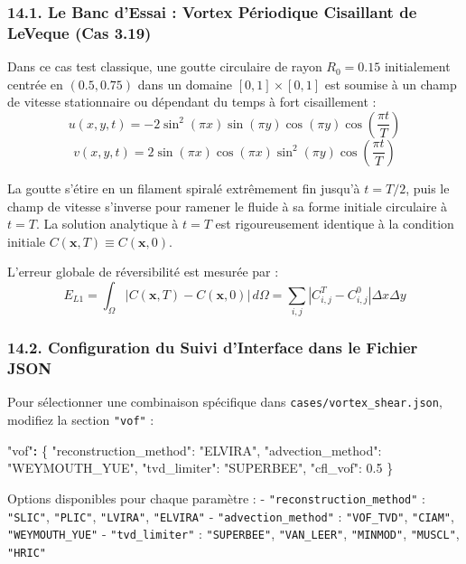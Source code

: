 \documentclass[
  french,
]{article}
\newenvironment{Shaded}{}{}
\newcommand{\DataTypeTok}[1]{\textcolor[rgb]{0.56,0.13,0.00}{#1}}
\newcommand{\ErrorTok}[1]{\textcolor[rgb]{1.00,0.00,0.00}{\textbf{#1}}}
\newcommand{\FloatTok}[1]{\textcolor[rgb]{0.25,0.63,0.44}{#1}}
\newcommand{\FunctionTok}[1]{\textcolor[rgb]{0.02,0.16,0.49}{#1}}
\newcommand{\StringTok}[1]{\textcolor[rgb]{0.25,0.44,0.63}{#1}}
\begin{document}
\subsubsection{14.1. Le Banc d'Essai : Vortex Périodique Cisaillant de
LeVeque (Cas
3.19)}\label{le-banc-dessai-vortex-puxe9riodique-cisaillant-de-leveque-cas-3.19}

Dans ce cas test classique, une goutte circulaire de rayon
\(R_0 = 0.15\) initialement centrée en \((0.5, 0.75)\) dans un domaine
\([0, 1] \times [0, 1]\) est soumise à un champ de vitesse stationnaire
ou dépendant du temps à fort cisaillement :
\[u(x, y, t) = -2 \sin^2(\pi x) \sin(\pi y) \cos(\pi y) \cos\left(\frac{\pi t}{T}\right)\]
\[v(x, y, t) = 2 \sin(\pi x) \cos(\pi x) \sin^2(\pi y) \cos\left(\frac{\pi t}{T}\right)\]

La goutte s'étire en un filament spiralé extrêmement fin jusqu'à
\(t = T/2\), puis le champ de vitesse s'inverse pour ramener le fluide à
sa forme initiale circulaire à \(t = T\). La solution analytique à
\(t = T\) est rigoureusement identique à la condition initiale
\(C(\mathbf{x}, T) \equiv C(\mathbf{x}, 0)\).

L'erreur globale de réversibilité est mesurée par :
\[E_{L1} = \int_\Omega |C(\mathbf{x}, T) - C(\mathbf{x}, 0)| \, d\Omega = \sum_{i, j} |C_{i, j}^T - C_{i, j}^0| \Delta x \Delta y\]

\subsubsection{14.2. Configuration du Suivi d'Interface dans le Fichier
JSON}\label{configuration-du-suivi-dinterface-dans-le-fichier-json}

Pour sélectionner une combinaison spécifique dans
\texttt{cases/vortex\_shear.json}, modifiez la section \texttt{"vof"} :

\begin{Shaded}
\begin{Highlighting}[]
\StringTok{"vof"}\ErrorTok{:} \FunctionTok{\{}
  \DataTypeTok{"reconstruction\_method"}\FunctionTok{:} \StringTok{"ELVIRA"}\FunctionTok{,}
  \DataTypeTok{"advection\_method"}\FunctionTok{:} \StringTok{"WEYMOUTH\_YUE"}\FunctionTok{,}
  \DataTypeTok{"tvd\_limiter"}\FunctionTok{:} \StringTok{"SUPERBEE"}\FunctionTok{,}
  \DataTypeTok{"cfl\_vof"}\FunctionTok{:} \FloatTok{0.5}
\FunctionTok{\}}
\end{Highlighting}
\end{Shaded}

Options disponibles pour chaque paramètre : -
\texttt{"reconstruction\_method"} : \texttt{"SLIC"}, \texttt{"PLIC"},
\texttt{"LVIRA"}, \texttt{"ELVIRA"} - \texttt{"advection\_method"} :
\texttt{"VOF\_TVD"}, \texttt{"CIAM"}, \texttt{"WEYMOUTH\_YUE"} -
\texttt{"tvd\_limiter"} : \texttt{"SUPERBEE"}, \texttt{"VAN\_LEER"},
\texttt{"MINMOD"}, \texttt{"MUSCL"}, \texttt{"HRIC"}
\end{document}
